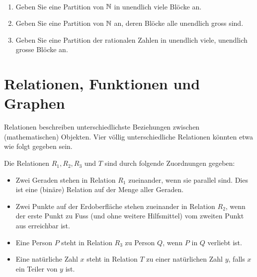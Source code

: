 \begin{ueb}~
\begin{enumerate}
\item Geben Sie eine Partition von $\mathbb{N}$ in unendlich viele Blöcke an.
\item Geben Sie eine Partition von $\mathbb{N}$ an, deren Blöcke alle unendlich gross sind.
\item Geben Sie eine Partition der rationalen Zahlen in unendlich viele, unendlich grosse
Blöcke an.
\end{enumerate}
\end{ueb}
\begin{lsg}
\end{lsg}


\section{Relationen, Funktionen und Graphen}

Relationen beschreiben unterschiedlichste Beziehungen zwischen (mathematischen) Objekten. Vier völlig unterschiedliche Relationen könnten etwa wie folgt gegeben sein.
\begin{bsp}\label{ex:Beispiel1relationen}
Die Relationen $R_1,R_2,R_3$ und $T$ sind durch folgende Zuordnungen gegeben:
\begin{itemize}
\item Zwei Geraden stehen in Relation $R_1$ zueinander, wenn sie parallel sind. Dies ist eine (binäre) Relation auf der Menge aller Geraden.
\item Zwei Punkte auf der Erdoberfläche stehen zueinander in Relation $R_2$, wenn der erste Punkt zu Fuss (und ohne weitere Hilfsmittel) vom zweiten Punkt aus erreichbar ist.
\item Eine Person $P$ steht in Relation $R_3$ zu Person $Q$, wenn $P$ in $Q$ verliebt ist.
\item Eine natürliche Zahl $x$ steht in Relation $T$ zu einer natürlichen Zahl $y$, falls $x$ ein Teiler von $y$ ist.
\end{itemize}
\end{bsp}

